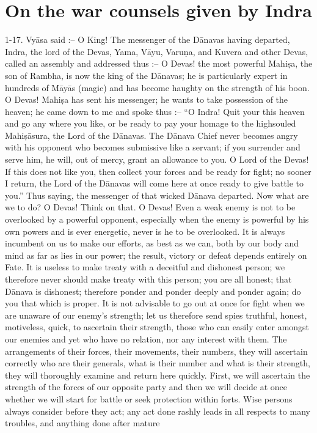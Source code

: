 \chapter{On the war counsels given by Indra}

1-17. Vy\=asa said :-- O King! The messenger of the D\=anavas having departed, Indra, the lord of the Devas, Yama, V\=ayu, Varu\d{n}a, and Kuvera and other Devas, called an assembly and addressed thus :-- O Devas! the most powerful Mahi\d{s}a, the son of Rambha, is now the king of the D\=anavas; he is particularly expert in hundreds of M\=ay\=as (magic) and has become haughty on the strength of his boon. O Devas! Mahi\d{s}a has sent his messenger; he wants to take possession of the heaven; he came down to me and spoke thus :-- ``O Indra! Quit your this heaven and go any where you like, or be ready to pay your homage to the highsouled Mahi\d{s}\=asura, the Lord of the D\=anavas. The D\=anava Chief never becomes angry with his opponent who becomes submissive like a servant; if you surrender and serve him, he will, out of mercy, grant an allowance to you. O Lord of the Devas! If this does not like you, then collect your forces and be ready for fight; no sooner I return, the Lord of the D\=anavas will come here at once ready to give battle to you.'' Thus saying, the messenger of that wicked D\=anava departed. Now what are we to do? O Devas! Think on that. O Devas! Even a weak enemy is not to be overlooked by a powerful opponent, especially when the enemy is powerful by his own powers and is ever energetic, never is he to be overlooked. It is always incumbent on us to make our efforts, as best as we can, both by our body and mind as far as lies in our power; the result, victory or defeat depends entirely on Fate. It is useless to make treaty with a deceitful and dishonest person; we therefore never should make treaty with this person; you are all honest; that D\=anava is dishonest; therefore ponder and ponder deeply and ponder again; do you that which is proper. It is not advisable to go out at once for fight when we are unaware of our enemy's strength; let us therefore send spies truthful, honest, motiveless, quick, to ascertain their strength, those who can easily enter amongst our enemies and yet who have no relation, nor any interest with them. The arrangements of their forces, their movements, their numbers, they will ascertain correctly who are their generals, what is their number and what is their strength, they will thoroughly examine and return here quickly. First, we will ascertain the strength of the forces of our opposite party and then we will decide at once whether we will start for battle or seek protection within forts. Wise persons always consider before they act; any act done rashly leads in all respects to many troubles, and anything done after mature

